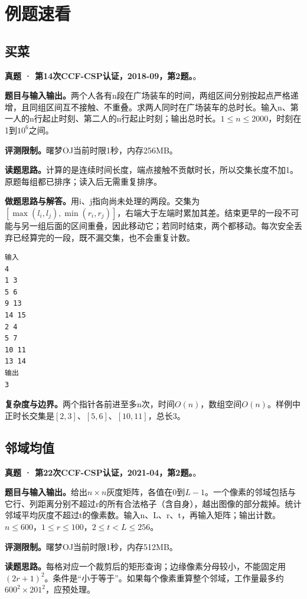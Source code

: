 \section{例题速看}
\subsection{买菜}
\textbf{真题 · 第14次CCF-CSP认证，2018-09，第2题。}。

\noindent\textbf{题目与输入输出。}两个人各有n段在广场装车的时间，两组区间分别按起点严格递增，且同组区间互不接触、不重叠。求两人同时在广场装车的总时长。输入n、第一人的n行起止时刻、第二人的n行起止时刻；输出总时长。$1\le n\le2000$，时刻在1到$10^6$之间。

\noindent\textbf{评测限制。}曙梦OJ当前时限1秒，内存256MB。

\noindent\textbf{读题思路。}计算的是连续时间长度，端点接触不贡献时长，所以交集长度不加1。原题每组都已排序；读入后无需重复排序。

\noindent\textbf{做题思路与解答。}用i、j指向尚未处理的两段。交集为$[\max(l_i,l_j),\min(r_i,r_j)]$，右端大于左端时累加其差。结束更早的一段不可能与另一组后面的区间重叠，因此移动它；若同时结束，两个都移动。每次安全丢弃已经算完的一段，既不漏交集，也不会重复计数。
\begin{verbatim}
输入
4
1 3
5 6
9 13
14 15
2 4
5 7
10 11
13 14
输出
3
\end{verbatim}

\noindent\textbf{复杂度与边界。}两个指针各前进至多n次，时间$O(n)$，数组空间$O(n)$。样例中正时长交集是$[2,3]$、$[5,6]$、$[10,11]$，总长3。
\subsection{邻域均值}
\textbf{真题 · 第22次CCF-CSP认证，2021-04，第2题。}。

\noindent\textbf{题目与输入输出。}给出$n\times n$灰度矩阵，各值在0到$L-1$。一个像素的邻域包括与它行、列距离分别不超过r的所有合法格子（含自身），越出图像的部分裁掉。统计邻域平均灰度不超过t的像素数。输入n、L、r、t，再输入矩阵；输出计数。$n\le600$，$1\le r\le100$，$2\le t<L\le256$。

\noindent\textbf{评测限制。}曙梦OJ当前时限1秒，内存512MB。

\noindent\textbf{读题思路。}每格对应一个裁剪后的矩形查询；边缘像素分母较小，不能固定用$(2r+1)^2$。条件是“小于等于”。如果每个像素重算整个邻域，工作量最多约$600^2\times201^2$，应预处理。

